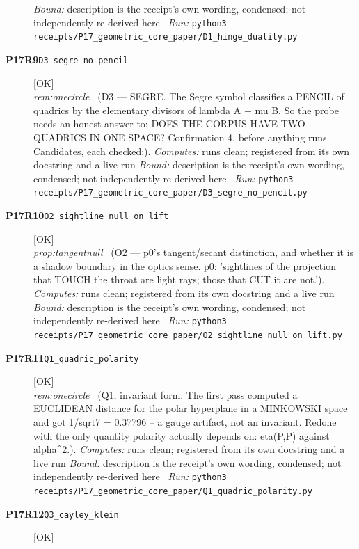 \begin{description}
 \emph{Bound:} description is the receipt's own wording, condensed; not independently re-derived here
\ \emph{Run:} \texttt{python3 receipts/P17\_geometric\_core\_paper/D1\_hinge\_duality.py}
\item[\rcptlabel{D3_segre_no_pencil}{P17R9}\textbf{P17R9}\quad\texttt{D3\_segre\_no\_pencil}]\hfill\textsf{[OK]}\\
\textit{rem:onecircle} \ (D3 --- SEGRE. The Segre symbol classifies a PENCIL of quadrics by the elementary divisors of lambda A + mu B. So the probe needs an honest answer to: DOES THE CORPUS HAVE TWO QUADRICS IN ONE SPACE? Confirmation 4, before anything runs. Candidates, each checked:). 
\emph{Computes:} runs clean; registered from its own docstring and a live run
 \emph{Bound:} description is the receipt's own wording, condensed; not independently re-derived here
\ \emph{Run:} \texttt{python3 receipts/P17\_geometric\_core\_paper/D3\_segre\_no\_pencil.py}
\item[\rcptlabel{O2_sightline_null_on_lift}{P17R10}\textbf{P17R10}\quad\texttt{O2\_sightline\_null\_on\_lift}]\hfill\textsf{[OK]}\\
\textit{prop:tangentnull} \ (O2 --- p0's tangent/secant distinction, and whether it is a shadow boundary in the optics sense. p0: 'sightlines of the projection that TOUCH the throat are light rays; those that CUT it are not.'). 
\emph{Computes:} runs clean; registered from its own docstring and a live run
 \emph{Bound:} description is the receipt's own wording, condensed; not independently re-derived here
\ \emph{Run:} \texttt{python3 receipts/P17\_geometric\_core\_paper/O2\_sightline\_null\_on\_lift.py}
\item[\rcptlabel{Q1_quadric_polarity}{P17R11}\textbf{P17R11}\quad\texttt{Q1\_quadric\_polarity}]\hfill\textsf{[OK]}\\
\textit{rem:onecircle} \ (Q1, invariant form. The first pass computed a EUCLIDEAN distance for the polar hyperplane in a MINKOWSKI space and got 1/sqrt7 = 0.37796 -- a gauge artifact, not an invariant. Redone with the only quantity polarity actually depends on: eta(P,P) against alpha\textasciicircum{}2.). 
\emph{Computes:} runs clean; registered from its own docstring and a live run
 \emph{Bound:} description is the receipt's own wording, condensed; not independently re-derived here
\ \emph{Run:} \texttt{python3 receipts/P17\_geometric\_core\_paper/Q1\_quadric\_polarity.py}
\item[\rcptlabel{Q3_cayley_klein}{P17R12}\textbf{P17R12}\quad\texttt{Q3\_cayley\_klein}]\hfill\textsf{[OK]}\\

\end{description}
